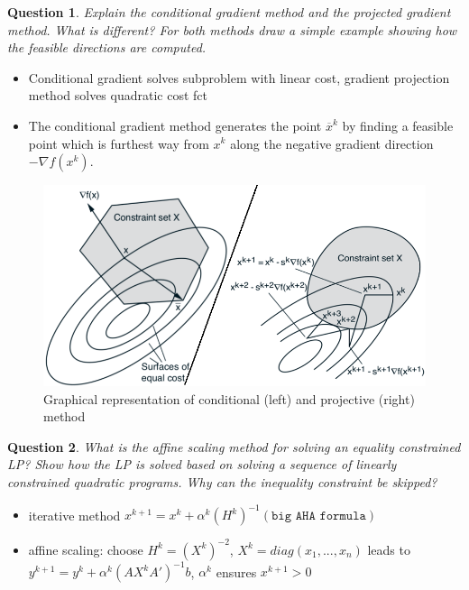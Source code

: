 \documentclass{article}
\newtheorem{question}{Question}
\begin{document}
\begin{question}
  Explain the conditional gradient method and the projected gradient method.  What is different? For
  both methods draw a simple example showing how the feasible directions are computed.
\end{question}
\begin{itemize}
\item Conditional gradient solves subproblem with linear cost, gradient projection method solves
  quadratic cost fct
\item The conditional gradient method generates the point $\overline{x}^k$ by finding a feasible
  point which is furthest way from $x^k$ along the negative gradient direction $-\nabla f (x^k )$.

\end{itemize}
\begin{figure}[H]
  \includegraphics[width=\textwidth]{proj_desc.png}
  \caption{Graphical representation of conditional (left) and projective (right)
    method\label{fig:proj_desc}}
\end{figure}

\begin{question}
  What is the affine scaling method for solving an equality constrained LP? Show how the LP is
  solved based on solving a sequence of linearly constrained quadratic programs. Why can the
  inequality constraint be skipped?
\end{question}
\begin{itemize}
\item iterative method $x^{k+1} = x^k + \alpha^k (H^k)^{-1} (\texttt{big AHA formula})$
\item affine scaling: choose $H^k = (X^k)^{-2}$, $X^k = diag(x_1, ..., x_n)$ leads to
  $y^{k+1} = y^k + \alpha^k (AX^k A' )^{-1} b $, $\alpha^k$ ensures $x^{k+1} > 0$
\end{itemize}
\end{document}
